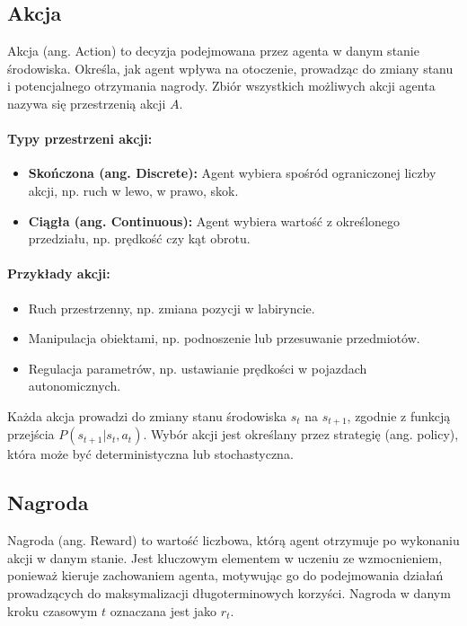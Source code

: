 \subsection{Akcja}

Akcja (ang. Action) to decyzja podejmowana przez agenta w danym stanie środowiska. Określa, jak agent wpływa na otoczenie, prowadząc do zmiany stanu i potencjalnego otrzymania nagrody. Zbiór wszystkich możliwych akcji agenta nazywa się przestrzenią akcji \(A\).

\paragraph{Typy przestrzeni akcji:}
\begin{itemize}
	\item \textbf{Skończona (ang. Discrete):} Agent wybiera spośród ograniczonej liczby akcji, np. ruch w lewo, w prawo, skok.
	\item \textbf{Ciągła (ang. Continuous):} Agent wybiera wartość z określonego przedziału, np. prędkość czy kąt obrotu.
\end{itemize}

\paragraph{Przykłady akcji:}
\begin{itemize}
	\item Ruch przestrzenny, np. zmiana pozycji w labiryncie.
	\item Manipulacja obiektami, np. podnoszenie lub przesuwanie przedmiotów.
	\item Regulacja parametrów, np. ustawianie prędkości w pojazdach autonomicznych.
\end{itemize}

Każda akcja prowadzi do zmiany stanu środowiska \(s_t\) na \(s_{t+1}\), zgodnie z funkcją przejścia \(P(s_{t+1} | s_t, a_t)\). Wybór akcji jest określany przez strategię (ang. policy), która może być deterministyczna lub stochastyczna.

\subsection{Nagroda}

Nagroda (ang. Reward) to wartość liczbowa, którą agent otrzymuje po wykonaniu akcji w danym stanie. Jest kluczowym elementem w uczeniu ze wzmocnieniem, ponieważ kieruje zachowaniem agenta, motywując go do podejmowania działań prowadzących do maksymalizacji długoterminowych korzyści. Nagroda w danym kroku czasowym \(t\) oznaczana jest jako \(r_t\).

